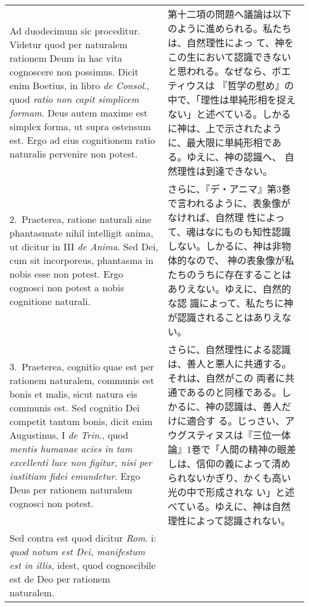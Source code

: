 \documentclass[10pt]{jsarticle} %
\begin{document}
\begin{longtable}{p{21em}p{21em}}

{\sc  Ad duodecimum sic proceditur}. Videtur quod per naturalem rationem
Deum in hac vita cognoscere non possimus. Dicit enim Boetius, in libro
{\it de Consol}., quod {\it ratio non capit simplicem formam}. Deus
autem maxime est simplex forma, ut supra ostensum est. Ergo ad eius
cognitionem ratio naturalis pervenire non potest.

&

第十二項の問題へ議論は以下のように進められる。私たちは、自然理性によっ
て、神をこの生において認識できないと思われる。なぜなら、ボエティウスは
『哲学の慰め』の中で、「理性は単純形相を捉えない」と述べている。しかる
に神は、上で示されたように、最大限に単純形相である。ゆえに、神の認識へ、
自然理性は到達できない。

\\

2.~{\sc  Praeterea}, ratione naturali sine phantasmate nihil
intelligit anima, ut dicitur in III {\it de Anima}. Sed Dei, cum sit
incorporeus, phantasma in nobis esse non potest. Ergo cognosci non
potest a nobis cognitione naturali.

&

さらに、『デ・アニマ』第3巻で言われるように、表象像がなければ、自然理
性によって、魂はなにものも知性認識しない。しかるに、神は非物体的なので、
神の表象像が私たちのうちに存在することはありえない。ゆえに、自然的な認
識によって、私たちに神が認識されることはありえない。

\\

3.~{\sc Praeterea}, cognitio quae est per rationem naturalem, communis
est bonis et malis, sicut natura eis communis est. Sed cognitio Dei
competit tantum bonis, dicit enim Augustinus, I {\it de Trin}., quod
{\it mentis humanae acies in tam excellenti luce non figitur, nisi per
iustitiam fidei emundetur}. Ergo Deus per rationem naturalem cognosci
non potest.

&

さらに、自然理性による認識は、善人と悪人に共通する。それは、自然がこの
両者に共通であるのと同様である。しかるに、神の認識は、善人だけに適合す
る。じっさい、アウグスティヌスは『三位一体論』1巻で「人間の精神の眼差
しは、信仰の義によって清められないかぎり、かくも高い光の中で形成されな
い」と述べている。ゆえに、神は自然理性によって認識されない。

\\

{\sc Sed contra est} quod dicitur {\it Rom}. {\sc i}: {\it quod notum
est Dei, manifestum est in illis}, idest, quod cognoscibile est de Deo
per rationem naturalem.


\end{longtable}
\end{document}
